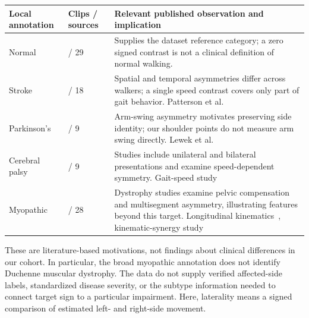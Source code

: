 \documentclass{article}
\begin{document}
\begin{table}[htbp]
\centering
\small
\begin{tabular}{@{}
  >{\raggedright\arraybackslash}p{}
  >{\raggedleft\arraybackslash}p{}
  >{\raggedright\arraybackslash}p{}@{}}
\toprule\noalign{}
\begin{minipage}[b]{\linewidth}\raggedright
Local annotation
\end{minipage} & \begin{minipage}[b]{\linewidth}\raggedleft
Clips / sources
\end{minipage} & \begin{minipage}[b]{\linewidth}\raggedright
Relevant published observation and implication
\end{minipage} \\
\midrule\noalign{}

Normal & 270 / 29 & Supplies the dataset reference category; a zero signed contrast is not a clinical definition of normal walking. \\
Stroke & 75 / 18 & Spatial and temporal asymmetries differ across walkers; a single speed contrast covers only part of gait behavior. Patterson et al.~\citep{ref01} \\
Parkinson's & 39 / 9 & Arm-swing asymmetry motivates preserving side identity; our shoulder points do not measure arm swing directly. Lewek et al.~\citep{ref02} \\
Cerebral palsy & 58 / 9 & Studies include unilateral and bilateral presentations and examine speed-dependent symmetry. Gait-speed study~\citep{ref03} \\
Myopathic & 183 / 28 & Dystrophy studies examine pelvic compensation and multisegment asymmetry, illustrating features beyond this target. Longitudinal kinematics~\citep{ref04}, kinematic-synergy study~\citep{ref05} \\
\bottomrule
\end{tabular}
\end{table}

These are literature-based motivations, not findings about clinical differences in our cohort. In particular, the broad myopathic annotation does not identify Duchenne muscular dystrophy. The data do not supply verified affected-side labels, standardized disease severity, or the subtype information needed to connect target sign to a particular impairment. Here, laterality means a signed comparison of estimated left- and right-side movement.
\end{document}
